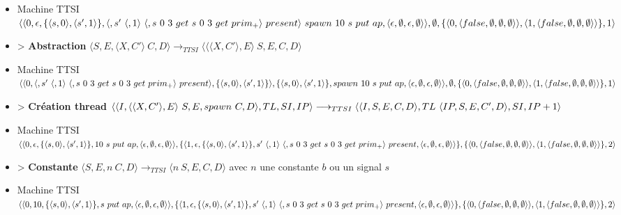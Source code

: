 \documentclass[10pt,a4paper]{article}
\begin{document}
\begin{itemize}
					\item[] Machine TTSI $\langle\langle 0, \epsilon ,\{\langle s,0\rangle,\langle s',1\rangle\},\langle, s'~\langle,1\rangle~\langle,s~0~3~get~s~0~3~get~prim_{+}\rangle~present\rangle~spawn~10~s~put~ap,\langle\epsilon,\emptyset,\epsilon,\emptyset\rangle\rangle\\,\emptyset,\{\langle 0,\langle false,\emptyset,\emptyset,\emptyset\rangle\rangle,\langle 1,\langle false,\emptyset,\emptyset,\emptyset\rangle\rangle\},1\rangle$
					\item[] > \textbf{Abstraction} $\langle S,E,\langle X,C'\rangle~C,D\rangle
					\longrightarrow_{TTSI} 
					\langle \langle\langle X,C'\rangle,E\rangle~S,E,C,D\rangle$
					\item[] Machine TTSI $\langle\langle 0, \langle, s'~\langle,1\rangle~\langle,s~0~3~get~s~0~3~get~prim_{+}\rangle~present\rangle,\{\langle s,0\rangle,\langle s',1\rangle\}\rangle ,\{\langle s,0\rangle,\langle s',1\rangle\},spawn~10~s~put~ap,\\\langle\epsilon,\emptyset,\epsilon,\emptyset\rangle\rangle,\emptyset,\{\langle 0,\langle false,\emptyset,\emptyset,\emptyset\rangle\rangle,\langle 1,\langle false,\emptyset,\emptyset,\emptyset\rangle\rangle\},1\rangle$
					\item[] > \textbf{Création thread} $\langle\langle I,\langle\langle X,C'\rangle, E\rangle~S,E,spawn~C,D\rangle,TL,SI,IP\rangle 
					\longrightarrow_{TTSI} 
					\\\langle\langle I,S,E,C,D\rangle,TL~\langle IP,S,E,C',D\rangle,SI,IP+1\rangle$
					\item[] Machine TTSI $\langle\langle 0,\epsilon,\{\langle s,0\rangle,\langle s',1\rangle\},10~s~put~ap,\langle\epsilon,\emptyset,\epsilon,\emptyset\rangle\rangle,\{\langle 1,\epsilon,\{\langle s,0\rangle,\langle s',1\rangle\}, s'~\langle,1\rangle~\langle,s~0~3~get~s~0~3~get~prim_{+}\rangle~present ,\\\langle\epsilon,\emptyset,\epsilon,\emptyset\rangle\rangle\},\{\langle 0,\langle false,\emptyset,\emptyset,\emptyset\rangle\rangle,\langle 1,\langle false,\emptyset,\emptyset,\emptyset\rangle\rangle\},2\rangle$
					\item[] > \textbf{Constante} $\langle S,E,n~C,D\rangle 
					\longrightarrow_{TTSI} 
					\langle n~S,E,C,D\rangle$ avec $n$ une constante $b$ ou un signal $s$
					\item[] Machine TTSI $\langle\langle 0,10,\{\langle s,0\rangle,\langle s',1\rangle\},s~put~ap,\langle\epsilon,\emptyset,\epsilon,\emptyset\rangle\rangle,\{\langle 1,\epsilon,\{\langle s,0\rangle,\langle s',1\rangle\}, s'~\langle,1\rangle~\langle,s~0~3~get~s~0~3~get~prim_{+}\rangle~present ,\\\langle\epsilon,\emptyset,\epsilon,\emptyset\rangle\rangle\},\{\langle 0,\langle false,\emptyset,\emptyset,\emptyset\rangle\rangle,\langle 1,\langle false,\emptyset,\emptyset,\emptyset\rangle\rangle\},2\rangle$

\end{itemize}
\end{document}
